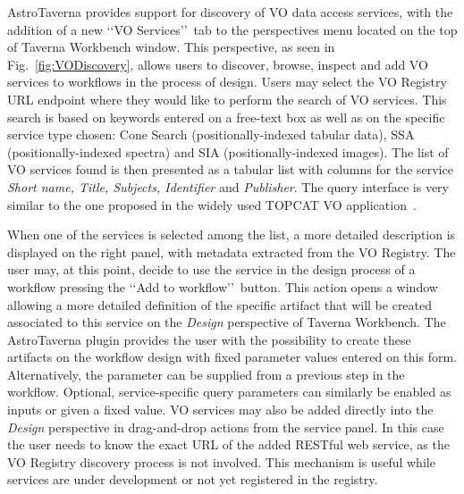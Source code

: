 \documentclass{aa}
\begin{document}
AstroTaverna provides support for discovery of VO data access services, with the addition of a new \lq\lq VO Services\rq\rq\ tab to the perspectives menu located on the top of Taverna Workbench window. This perspective, as seen in Fig.~\ref{fig:VODiscovery}, allows users to discover, browse, inspect and add VO services to workflows in the process of design. Users may select the VO Registry URL endpoint where they would like to perform the search of VO services. This search is based on keywords entered on a free-text box as well as on the specific service type chosen: Cone Search (positionally-indexed tabular data), SSA (positionally-indexed spectra) and SIA (positionally-indexed images). The list of VO services found is then presented as a tabular list with columns for the service \textit{Short name, Title, Subjects, Identifier} and \textit{Publisher}. The query interface is very similar to the one proposed in the widely used TOPCAT VO application~\citep{Taylor2011}. 

When one of the services is selected among the list, a more detailed description is displayed on the right panel, with metadata extracted from the VO Registry. The user may, at this point, decide to use the service in the design process of a workflow pressing the \lq\lq Add to workflow\rq\rq\ button. This action opens a window allowing a more detailed definition of the specific artifact that will be created associated to this service on the \emph{Design} perspective of Taverna Workbench. The AstroTaverna plugin provides the user with the possibility to create these artifacts on the workflow design with fixed parameter values entered on this form. Alternatively, the parameter can be supplied from a previous step in the workflow. Optional, service-specific query parameters can similarly be enabled as inputs or given a fixed value. VO services may also be added directly into the \emph{Design} perspective in drag-and-drop actions from the service panel. In this case the user needs to know the exact URL of the added RESTful web service, as the VO Registry discovery process is not involved. This mechanism is useful while services are under development or not yet registered in the registry.
\end{document}
